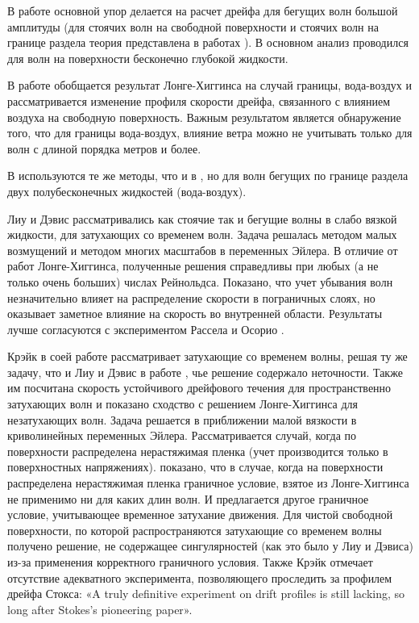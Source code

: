 В работе \cite{dore1977mass} основной упор делается на расчет дрейфа для бегущих волн большой амплитуды (для стоячих волн на свободной поверхности и стоячих волн на границе раздела теория представлена в работах \cite{dore1976double,dore1976double2}). В основном анализ проводился для волн на поверхности бесконечно глубокой жидкости. 

В работе \cite{dore1978some} обобщается результат Лонге-Хиггинса \cite{longuet1953mass} на случай границы, вода-воздух и рассматривается изменение профиля скорости дрейфа, связанного с влиянием воздуха на свободную поверхность. Важным результатом является обнаружение того, что для границы вода-воздух, влияние ветра можно не учитывать только для волн с длиной порядка метров и более.

В \cite{dore1978double} используются те же методы, что и в \cite{dore1977mass}, но для волн бегущих по границе раздела двух полубесконечных жидкостей (вода-воздух). 

Лиу и Дэвис \cite{liu1977viscous} рассматривались как стоячие так и бегущие волны в слабо вязкой жидкости, для затухающих со временем волн. Задача решалась методом малых возмущений и методом многих масштабов в переменных Эйлера. В отличие от работ Лонге-Хиггинса, полученные решения справедливы при любых (а не только очень больших) числах Рейнольдса.
Показано, что учет убывания волн незначительно влияет на распределение скорости в пограничных слоях, но оказывает заметное влияние на скорость во внутренней области. Результаты лучше согласуются с экспериментом Рассела и Осорио \cite{russell1957experimental}.

Крэйк в соей работе \cite{craik1982drift} рассматривает затухающие со временем волны, решая ту же задачу, что и Лиу и Дэвис в работе \cite{liu1977viscous}, чье решение содержало неточности. Также им посчитана скорость устойчивого дрейфового течения для пространственно затухающих волн и показано сходство с решением Лонге-Хиггинса для незатухающих волн. 
Задача решается в приближении малой вязкости в криволинейных переменных Эйлера. Рассматривается случай, когда по поверхности распределена нерастяжимая пленка (учет производится только в поверхностных напряжениях). показано, что в случае, когда на поверхности распределена нерастяжимая пленка граничное условие, взятое из Лонге-Хиггинса \cite{longuet1953mass} не применимо ни для каких длин волн. И предлагается другое граничное условие, учитывающее временное затухание движения. Для чистой свободной поверхности, по которой распространяются затухающие со временем волны получено решение, не содержащее сингулярностей (как это было у Лиу и Дэвиса) из-за применения корректного граничного условия.
Также Крэйк отмечает отсутствие адекватного эксперимента, позволяющего проследить за профилем дрейфа Стокса: «A truly definitive experiment on drift profiles is still lacking, so long after Stokes’s pioneering paper».

